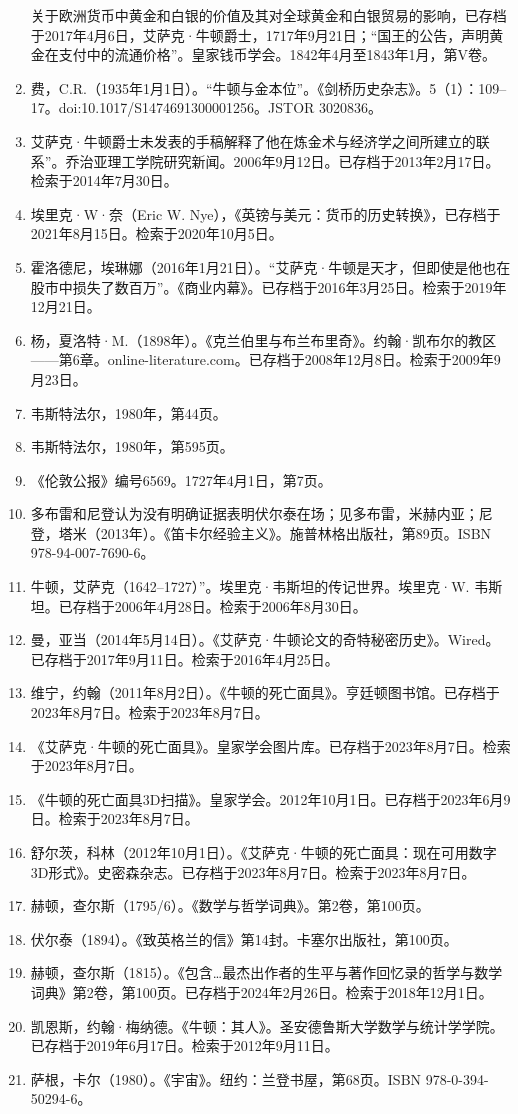 \begin{enumerate}
关于欧洲货币中黄金和白银的价值及其对全球黄金和白银贸易的影响，已存档于2017年4月6日，艾萨克·牛顿爵士，1717年9月21日；“国王的公告，声明黄金在支付中的流通价格”。皇家钱币学会。1842年4月至1843年1月，第V卷。  
\item 费，C.R.（1935年1月1日）。“牛顿与金本位”。《剑桥历史杂志》。5（1）：109–17。doi:10.1017/S1474691300001256。JSTOR 3020836。  
\item 艾萨克·牛顿爵士未发表的手稿解释了他在炼金术与经济学之间所建立的联系”。乔治亚理工学院研究新闻。2006年9月12日。已存档于2013年2月17日。检索于2014年7月30日。
\item 埃里克·W·奈（Eric W. Nye），《英镑与美元：货币的历史转换》，已存档于2021年8月15日。检索于2020年10月5日。  
\item 霍洛德尼，埃琳娜（2016年1月21日）。“艾萨克·牛顿是天才，但即使是他也在股市中损失了数百万”。《商业内幕》。已存档于2016年3月25日。检索于2019年12月21日。
\item 杨，夏洛特·M.（1898年）。《克兰伯里与布兰布里奇》。约翰·凯布尔的教区——第6章。online-literature.com。已存档于2008年12月8日。检索于2009年9月23日。  
\item 韦斯特法尔，1980年，第44页。  
\item 韦斯特法尔，1980年，第595页。  
\item 《伦敦公报》编号6569。1727年4月1日，第7页。  
\item 多布雷和尼登认为没有明确证据表明伏尔泰在场；见多布雷，米赫内亚；尼登，塔米（2013年）。《笛卡尔经验主义》。施普林格出版社，第89页。ISBN 978-94-007-7690-6。  
\item 牛顿，艾萨克（1642–1727）”。埃里克·韦斯坦的传记世界。埃里克·W. 韦斯坦。已存档于2006年4月28日。检索于2006年8月30日。
\item 曼，亚当（2014年5月14日）。《艾萨克·牛顿论文的奇特秘密历史》。Wired。已存档于2017年9月11日。检索于2016年4月25日。  
\item 维宁，约翰（2011年8月2日）。《牛顿的死亡面具》。亨廷顿图书馆。已存档于2023年8月7日。检索于2023年8月7日。  
\item 《艾萨克·牛顿的死亡面具》。皇家学会图片库。已存档于2023年8月7日。检索于2023年8月7日。  
\item 《牛顿的死亡面具3D扫描》。皇家学会。2012年10月1日。已存档于2023年6月9日。检索于2023年8月7日。  
\item 舒尔茨，科林（2012年10月1日）。《艾萨克·牛顿的死亡面具：现在可用数字3D形式》。史密森杂志。已存档于2023年8月7日。检索于2023年8月7日。
\item 赫顿，查尔斯（1795/6）。《数学与哲学词典》。第2卷，第100页。  
\item 伏尔泰（1894）。《致英格兰的信》第14封。卡塞尔出版社，第100页。  
\item 赫顿，查尔斯（1815）。《包含…最杰出作者的生平与著作回忆录的哲学与数学词典》第2卷，第100页。已存档于2024年2月26日。检索于2018年12月1日。  
\item 凯恩斯，约翰·梅纳德。《牛顿：其人》。圣安德鲁斯大学数学与统计学学院。已存档于2019年6月17日。检索于2012年9月11日。  
\item 萨根，卡尔（1980）。《宇宙》。纽约：兰登书屋，第68页。ISBN 978-0-394-50294-6。





\end{enumerate}
